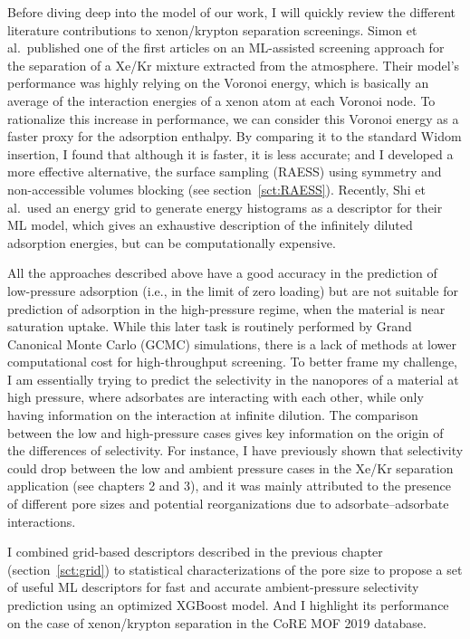 \documentclass[main]{subfiles}
\begin{document}
Before diving deep into the model of our work, I will quickly review the different literature contributions to xenon/krypton separation screenings. Simon et al.\ published one of the first articles on an ML-assisted screening approach for the separation of a Xe/Kr mixture extracted from the atmosphere.\autocite{Simon_2015} Their model's performance was highly relying on the Voronoi energy, which is basically an average of the interaction energies of a xenon atom at each Voronoi node.\autocite{Rycroft_2009} To rationalize this increase in performance, we can consider this Voronoi energy as a faster proxy for the adsorption enthalpy. By comparing it to the standard Widom insertion, I found that although it is faster, it is less accurate; and I developed a more effective alternative, the surface sampling (RAESS) using symmetry and non-accessible volumes blocking (see section~\ref{sct:RAESS}). Recently, Shi et al.\ used an energy grid to generate energy histograms as a descriptor for their ML model, which gives an exhaustive description of the infinitely diluted adsorption energies,\autocite{Shi_2023} but can be computationally expensive.

All the approaches described above have a good accuracy in the prediction of low-pressure adsorption (i.e., in the limit of zero loading) but are not suitable for prediction of adsorption in the high-pressure regime, when the material is near saturation uptake. While this later task is routinely performed by Grand Canonical Monte Carlo (GCMC) simulations, there is a lack of methods at lower computational cost for high-throughput screening. To better frame my challenge, I am essentially trying to predict the selectivity in the nanopores of a material at high pressure, where adsorbates are interacting with each other, while only having information on the interaction at infinite dilution. The comparison between the low and high-pressure cases gives key information on the origin of the differences of selectivity. For instance, I have previously shown that selectivity could drop between the low and ambient pressure cases in the Xe/Kr separation application (see chapters 2 and 3), and it was mainly attributed to the presence of different pore sizes and potential reorganizations due to adsorbate--adsorbate interactions.

I combined grid-based descriptors described in the previous chapter (section~\ref{sct:grid}) to statistical characterizations of the pore size to propose a set of useful ML descriptors for fast and accurate ambient-pressure selectivity prediction using an optimized XGBoost model. And I highlight its performance on the case of xenon/krypton separation in the CoRE MOF 2019 database\autocite{Chung_2019}.
\end{document}
